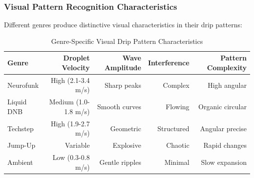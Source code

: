 \subsubsection{Visual Pattern Recognition Characteristics}

Different genres produce distinctive visual characteristics in their drip patterns:

\begin{table}[H]
\centering
\caption{Genre-Specific Visual Drip Pattern Characteristics}
\begin{tabular}{@{}lrrrr@{}}
\toprule
\textbf{Genre} & \textbf{Droplet Velocity} & \textbf{Wave Amplitude} & \textbf{Interference} & \textbf{Pattern Complexity} \\
\midrule
Neurofunk & High (2.1-3.4 m/s) & Sharp peaks & Complex & High angular \\
Liquid DNB & Medium (1.0-1.8 m/s) & Smooth curves & Flowing & Organic circular \\
Techstep & High (1.9-2.7 m/s) & Geometric & Structured & Angular precise \\
Jump-Up & Variable & Explosive & Chaotic & Rapid changes \\
Ambient & Low (0.3-0.8 m/s) & Gentle ripples & Minimal & Slow expansion \\
\bottomrule
\end{tabular}
\end{table}

\